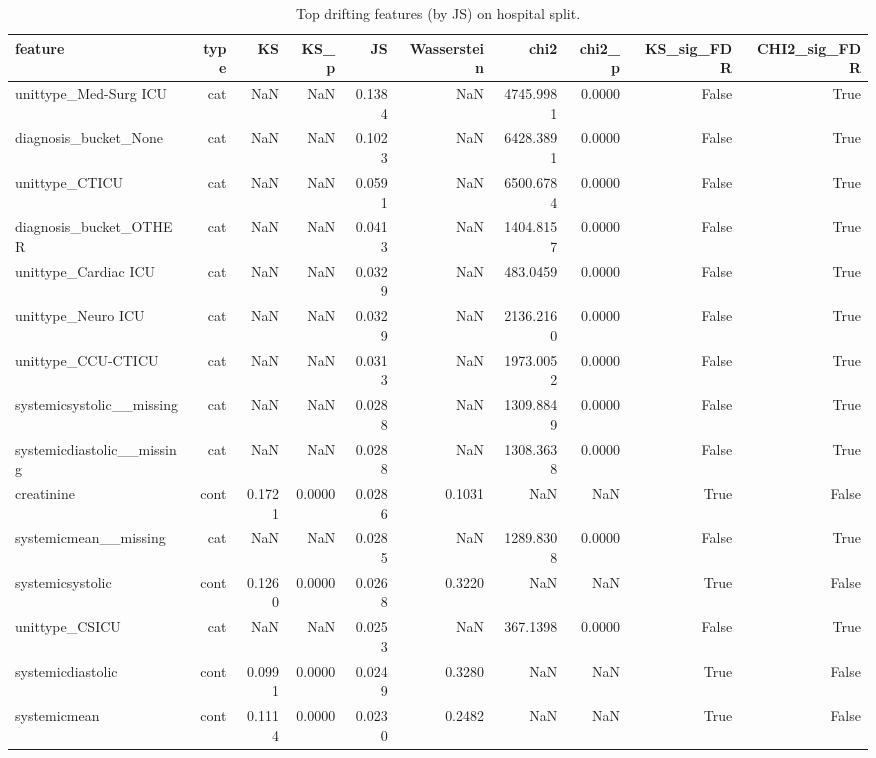 \begin{table}
\caption{Top drifting features (by JS) on hospital split.}
\label{tab:topdrifting-hospital}
\begin{tabular}{lrrrrrrrrr}
\toprule
feature & type & KS & KS\_p & JS & Wasserstein & chi2 & chi2\_p & KS\_sig\_FDR & CHI2\_sig\_FDR \\
\midrule
unittype\_Med-Surg ICU & cat & NaN & NaN & 0.1384 & NaN & 4745.9981 & 0.0000 & False & True \\
diagnosis\_bucket\_None & cat & NaN & NaN & 0.1023 & NaN & 6428.3891 & 0.0000 & False & True \\
unittype\_CTICU & cat & NaN & NaN & 0.0591 & NaN & 6500.6784 & 0.0000 & False & True \\
diagnosis\_bucket\_OTHER & cat & NaN & NaN & 0.0413 & NaN & 1404.8157 & 0.0000 & False & True \\
unittype\_Cardiac ICU & cat & NaN & NaN & 0.0329 & NaN & 483.0459 & 0.0000 & False & True \\
unittype\_Neuro ICU & cat & NaN & NaN & 0.0329 & NaN & 2136.2160 & 0.0000 & False & True \\
unittype\_CCU-CTICU & cat & NaN & NaN & 0.0313 & NaN & 1973.0052 & 0.0000 & False & True \\
systemicsystolic\_\_missing & cat & NaN & NaN & 0.0288 & NaN & 1309.8849 & 0.0000 & False & True \\
systemicdiastolic\_\_missing & cat & NaN & NaN & 0.0288 & NaN & 1308.3638 & 0.0000 & False & True \\
creatinine & cont & 0.1721 & 0.0000 & 0.0286 & 0.1031 & NaN & NaN & True & False \\
systemicmean\_\_missing & cat & NaN & NaN & 0.0285 & NaN & 1289.8308 & 0.0000 & False & True \\
systemicsystolic & cont & 0.1260 & 0.0000 & 0.0268 & 0.3220 & NaN & NaN & True & False \\
unittype\_CSICU & cat & NaN & NaN & 0.0253 & NaN & 367.1398 & 0.0000 & False & True \\
systemicdiastolic & cont & 0.0991 & 0.0000 & 0.0249 & 0.3280 & NaN & NaN & True & False \\
systemicmean & cont & 0.1114 & 0.0000 & 0.0230 & 0.2482 & NaN & NaN & True & False \\
\bottomrule
\end{tabular}
\end{table}
